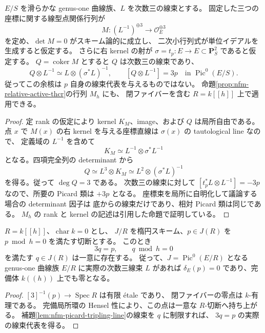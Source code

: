 \begin{proposition}[点関係行列の余核は平行移動の三倍を表す]
\label{prop:nfm-point-matrix-tripling-line}
$E/S$ を滑らかな genus-one 曲線族、$L$ を次数三の線束とする。
固定した三つの座標に関する線型点関係行列が
\[
 M:(L^{-1})^{\oplus3}\longrightarrow\mathcal O_E^{\oplus3}
\]
を定め、$\det M=0$ がスキーム論的に成立し、
二次小行列式が単位イデアルを生成すると仮定する。
さらに右 kernel の射が
$\sigma=t_p:E\to E\subset\mathbf P^2_S$ であると仮定する。
$Q=\operatorname{coker}M$ とすると $Q$ は次数三の線束であり、
\begin{equation}
\label{eq:nfm-point-matrix-tripling-line}
 Q\otimes L^{-1}\simeq L\otimes(\sigma^*L)^{-1},
 \qquad [Q\otimes L^{-1}]=3p
       \quad\text{in }\operatorname{Pic}^0(E/S).
\end{equation}
従ってこの余核は $p$ 自身の線束代表を与えるものではない。
命題\ref{prop:nfm-relative-active-thcr}の行列 $M_h$ にも、
閉ファイバーを含む $R=k[[h]]$ 上で適用できる。
\end{proposition}

\begin{proof}
定 rank の仮定により kernel $K_M$、image、および $Q$ は局所自由である。
点 $x$ で $M(x)$ の右 kernel を与える座標直線は
$\sigma(x)$ の tautological line なので、
定義域の $L^{-1}$ を含めて
\[
 K_M\simeq L^{-1}\otimes\sigma^*L^{-1}
\]
となる。四項完全列の determinant から
\[
 Q\simeq L^3\otimes K_M
       \simeq L^2\otimes(\sigma^*L)^{-1}
\]
を得る。従って $\deg Q=3$ である。
次数三の線束に対して
$[t_p^*L\otimes L^{-1}]=-3p$ なので、所要の Picard 類は $+3p$ となる。
座標束を局所に自明化して議論する場合の determinant 因子は
底からの線束だけであり、相対 Picard 類は同じである。
$M_h$ の rank と kernel の記述は引用した命題で証明している。
\end{proof}

\begin{lemma}[恒等平行移動からの形式変形の三分可能性]
\label{lem:nfm-formal-point-third-division}
$R=k[[h]]$、$\operatorname{char}k=0$ とし、
$J/R$ を楕円スキーム、$p\in J(R)$ を $p\bmod h=0$ を満たす切断とする。
このとき
\[
 3q=p,\qquad q\bmod h=0
\]
を満たす $q\in J(R)$ は一意に存在する。
従って、$J=\operatorname{Pic}^0(E/R)$ となる genus-one 曲線族
$E/R$ に実際の次数三線束 $L$ があれば
$\delta_E(p)=0$ であり、完備体 $k((h))$ 上でも零となる。
\end{lemma}

\begin{proof}
$[3]^{-1}(p)\to\operatorname{Spec}R$ は有限 \'etale であり、
閉ファイバーの零点は $k$-有理である。
完備局所環の Hensel 性により、この点は一意な $R$-切断へ持ち上がる。
補題\ref{lem:nfm-picard-tripling-line}の線束を $q$ に制限すれば、
$3q=p$ の実際の線束代表を得る。
\end{proof}

